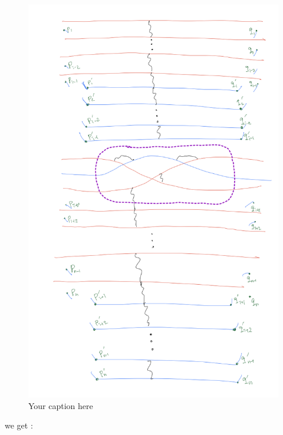 \begin{figure}[H] %
    \centering
    \includegraphics[width=\linewidth]{diagrams/definition12/11.png} %
    \caption{Your caption here}
    \label{fig:your-label}
\end{figure}

we get :

